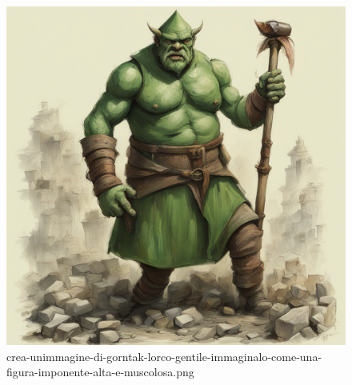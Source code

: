 \begin{figure}
\centering
\includegraphics{crea-unimmagine-di-gorntak-lorco-gentile-immaginalo-come-una-figura-imponente-alta-e-muscolosa.png}
\caption{crea-unimmagine-di-gorntak-lorco-gentile-immaginalo-come-una-figura-imponente-alta-e-muscolosa.png}
\end{figure}
